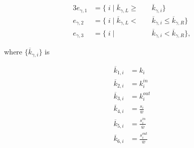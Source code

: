 \documentclass[%
	aip,
	jmp,%
	amsmath,amssymb,
	reprint,%
]{revtex4-1}
\begin{document}
																																																																																\begin{alignat}{3}\label{eq:part}
																																																																																	e_{\gamma,1}&=\{\;i\;|\;\overline{k}_{\gamma,L}\geq&&\overline{k}_{\gamma,i}\} \nonumber \\
																																																																																	e_{\gamma,2}&=\{\;i\;|\;\overline{k}_{\gamma,L}<\;&&\overline{k}_{\gamma,i}\leq\overline{k}_{\gamma,R}\} \\ 
																																																																																	e_{\gamma,3}&=\{\;i\;|\;&&\overline{k}_{\gamma,i}<\overline{k}_{\gamma,R}\} \nonumber,
																																																																																\end{alignat}

																																																																																\noindent where $\{\overline{k}_{\gamma,i}\}$ is

																																																																																\begin{equation}
																																																																																	\begin{split}
																																																																																		\overline{k}_{1,i}&=k_i \\
																																																																																		\overline{k}_{2,i}&=k_i^{in} \\
																																																																																		\overline{k}_{3,i}&=k_i^{out} \\
																																																																																		\overline{k}_{4,i}&=\frac{s_i}{\overline{w}} \\
																																																																																		\overline{k}_{5,i}&=\frac{s_i^{in}}{\overline{w}} \\
																																																																																		\overline{k}_{6,i}&=\frac{s_i^{out}}{\overline{w}}
																																																																																	\end{split}
																																																																																\end{equation}
\end{document}
